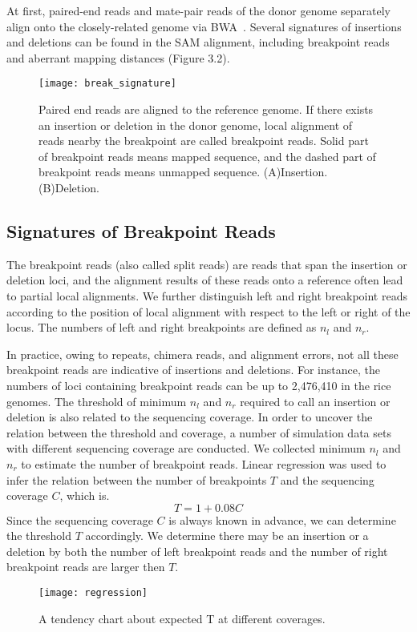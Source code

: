 At first, paired-end reads and mate-pair reads of the donor genome separately align onto the closely-related genome via BWA~\cite{BWA}. Several signatures of insertions and deletions can be found in the SAM alignment, including breakpoint reads and aberrant mapping distances (Figure 3.2). 

\begin{figure}[ht]
\begin{center}
\texttt{[image: break\_signature]}
\caption{Paired end reads are aligned to the reference genome. If there exists an insertion or deletion in the donor genome, local alignment of reads nearby the breakpoint are called breakpoint reads. Solid part of breakpoint reads means mapped sequence, and the dashed part of breakpoint reads means unmapped sequence. (A)Insertion. (B)Deletion.}
\label{}
\end{center}
\end{figure}

\subsection{Signatures of Breakpoint Reads}

The breakpoint reads (also called split reads) are reads that span the insertion or deletion loci, and the alignment results of these reads onto a reference often lead to partial local alignments. We further distinguish left and right breakpoint reads according to the position of local alignment with respect to the left or right of the locus. The numbers of left and right breakpoints are defined as $n_l$ and $n_r$.

In practice, owing to repeats, chimera reads, and alignment errors, not all these breakpoint reads are indicative of insertions and deletions. For instance, the numbers of loci containing breakpoint reads can be up to 2,476,410 in the rice genomes. The threshold of minimum $n_l$ and $n_r$ required to call an insertion or deletion is also related to the sequencing coverage. In order to uncover the relation between the threshold and coverage, a number of simulation data sets with different sequencing coverage are conducted. We collected minimum $n_l$ and $n_r$ to estimate the number of breakpoint reads. Linear regression was used to infer the relation between the number of breakpoints $T$ and the sequencing coverage $C$, which is.
\begin{equation} T=1+0.08C
\end{equation}
Since the sequencing coverage $C$ is always known in advance, we can determine the threshold $T$ accordingly. We determine there may be an insertion or a deletion by both the number of left breakpoint reads and the number of right breakpoint reads are larger then $T$. 
\begin{figure}[ht]
\begin{center}
\texttt{[image: regression]}
\caption{A tendency chart about expected T at different coverages.}
\label{}
\end{center}
\end{figure}







